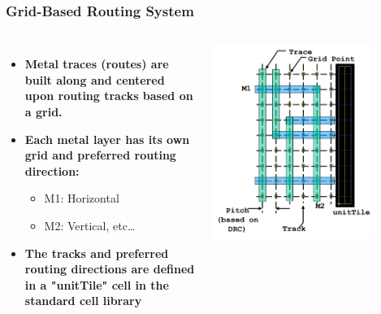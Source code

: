 \documentclass[compress]{beamer}
\begin{document}
	\begin{frame}
		\frametitle{Grid-Based Routing System}
		\begin{columns}	
		\begin{itemize}
			\item \textbf{Metal traces (routes) are built along and centered upon routing tracks based on a grid.}
			\item \textbf{Each metal layer has its own grid and preferred routing direction:}
			\begin{itemize}
				\item M1: Horizontal
				\item M2: Vertical, etc…
			\end{itemize}
			\item \textbf{The tracks and preferred routing directions are defined in a "unitTile" cell in the standard cell library}		
		\end{itemize}
		\begin{center}
			\includegraphics[width=0.8\textwidth]{Grid}
		\end{center}
		\end{columns}	
	\end{frame}
\end{document}
